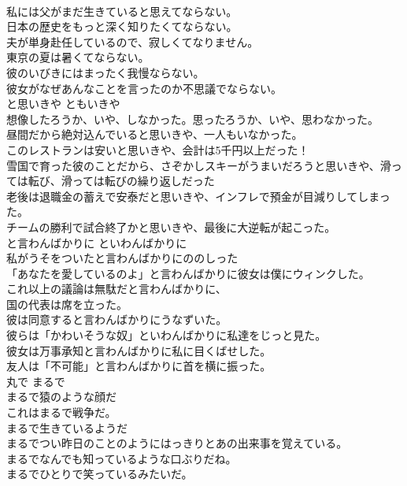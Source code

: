 \documentclass[8pt]{extreport}
\begin{document}
\begin{CJK}{UTF8}{min}
\\	私には父がまだ生きていると思えてならない。   
\\	日本の歴史をもっと深く知りたくてならない。   
\\	夫が単身赴任しているので、寂しくてなりません。   
\\	東京の夏は暑くてならない。  
\\	彼のいびきにはまったく我慢ならない。   
\\	彼女がなぜあんなことを言ったのか不思議でならない。   
\\	と思いきや	ともいきや	
\\	想像したろうか、いや、しなかった。思ったろうか、いや、思わなかった。
\\	昼間だから絶対込んでいると思いきや、一人もいなかった。  
\\	このレストランは安いと思いきや、会計は5千円以上だった！  
\\	雪国で育った彼のことだから、さぞかしスキーがうまいだろうと思いきや、滑っては転び、滑っては転びの繰り返しだった  
\\	老後は退職金の蓄えで安泰だと思いきや、インフレで預金が目減りしてしまった。  
\\	チームの勝利で試合終了かと思いきや、最後に大逆転が起こった。  
\\	と言わんばかりに	といわんばかりに	
\\	私がうそをついたと言わんばかりにののしった  
\\	「あなたを愛しているのよ」と言わんばかりに彼女は僕にウィンクした。  
\\	これ以上の議論は無駄だと言わんばかりに、
\\	国の代表は席を立った。   
\\	彼は同意すると言わんばかりにうなずいた。  
\\	彼らは「かわいそうな奴」といわんばかりに私達をじっと見た。  
\\	彼女は万事承知と言わんばかりに私に目くばせした。  
\\	友人は「不可能」と言わんばかりに首を横に振った。   
\\	丸で	まるで	
\\	まるで猿のような顔だ  
\\	これはまるで戦争だ。  
\\	まるで生きているようだ  
\\	まるでつい昨日のことのようにはっきりとあの出来事を覚えている。   
\\	まるでなんでも知っているような口ぶりだね。   
\\	まるでひとりで笑っているみたいだ。   

\end{CJK}
\end{document}
